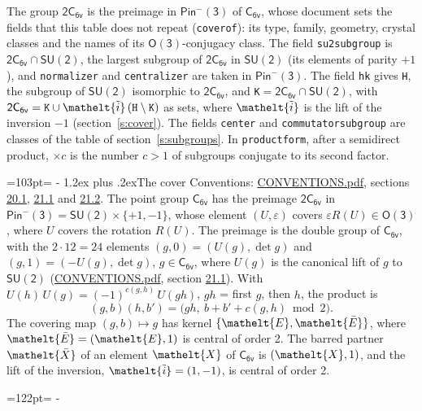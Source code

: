 \documentclass[10pt,a4paper]{article}
\makeatletter
\renewcommand\section{\@startsection{section}{1}{\z@}{-3ex plus -1ex minus -.2ex}%
  {1.2ex plus .2ex}{\normalfont\large\sffamily\bfseries\color{parttitle}}}
\newcommand{\needspace}[1]{\par\penalty-100\begingroup\dimen0=#1\relax\dimen2=\pagegoal
  \advance\dimen2-\pagetotal\ifdim\dimen0>\dimen2\relax\ifdim\dimen2>0pt\vfil\break\fi\fi
  \endgroup}
\numberwithin{equation}{section}
\newcommand{\eltfont}[1]{{\let\sigma\eltsigma\mathelt{#1}}}
\newcommand{\grp}[1]{\mathsf{#1}}
\newcommand{\elt}[1]{\eltfont{#1}}
\newcommand{\dirprod}{\times}
\newcommand{\barred}[1]{\bar{#1}}
\newcommand{\lift}[1]{\tilde{#1}}
\makeatother
\begin{document}
\leavevmode\label{n:element.inversion}\label{n:group.preimage}The group $\grp{2C_{6v}}$ is the preimage in $\grp{Pin^{-}(3)}$ of \href{../../../rotation/data/pdf/C6v.pdf}{$\grp{C_{6v}}$}, whose document sets the fields that this table does not repeat (\texttt{coverof}): its type, family, geometry, crystal classes and the names of its \href{../../../rotation/data/pdf/O3.pdf}{$\grp{O(3)}$}-conjugacy class. The field \texttt{su2subgroup} is $\grp{2C_{6v}} \cap \grp{SU(2)}$, the largest subgroup of $\grp{2C_{6v}}$ in $\grp{SU(2)}$ (its elements of parity $+1$), and \texttt{normalizer} and \texttt{centralizer} are taken in $\grp{Pin^{-}(3)}$. The field \texttt{hk} gives \texttt{H}, the subgroup of $\grp{SU(2)}$ isomorphic to $\grp{2C_{6v}}$, and \texttt{K}${} = \grp{2C_{6v}} \cap \grp{SU(2)}$, with $\grp{2C_{6v}} = \texttt{K} \cup \elt{\lift{i}}\,(\texttt{H} \setminus \texttt{K})$ as sets, where $\elt{\lift{i}}$ is the lift of the inversion $-1$ (section~\ref{s:cover}). The fields \texttt{center} and \texttt{commutatorsubgroup} are classes of the table of section~\ref{s:subgroups}.
\leavevmode\label{n:index.conjugates.c}In \texttt{productform}, after a semidirect product, ${\times}c$ is the number $c > 1$ of subgroups conjugate to its second factor.
\needspace{103pt}
\section{The cover}\label{s:cover}
Conventions: \href{../../CONVENTIONS.pdf}{CONVENTIONS.pdf}, sections \href{../../CONVENTIONS.pdf\#conv.20.1}{20.1}, \href{../../CONVENTIONS.pdf\#conv.21.1}{21.1} and \href{../../CONVENTIONS.pdf\#conv.21.2}{21.2}.
\leavevmode\label{n:group.pin.minus}\label{n:group.su2}\label{n:local.pin.sign}\label{n:matrix.covered}\label{n:matrix.lift.su2}\label{n:index.bar}The point group $\grp{C_{6v}}$ has the preimage $\grp{2C_{6v}}$ in $\grp{Pin^{-}(3)} = \grp{SU(2)} \dirprod \{+1, -1\}$, whose element $(U, \varepsilon)$ covers $\varepsilon R(U) \in \grp{O(3)}$, where $U$ covers the rotation $R(U)$. The preimage is the double group of $\grp{C_{6v}}$, with the $2 \cdot 12 = 24$ elements $(g, 0) = (U(g), \det g)$ and $(g, 1) = (-U(g), \det g)$, $g \in \grp{C_{6v}}$, where $U(g)$ is the canonical lift of $g$ to $\grp{SU(2)}$ (\href{../../CONVENTIONS.pdf}{CONVENTIONS.pdf}, section \href{../../CONVENTIONS.pdf\#conv.21.1}{21.1}). \label{n:function.cocycle}With $U(h)\,U(g) = (-1)^{c(g,h)}\,U(gh)$, $gh$ = first $g$, then $h$, the product is
\begin{equation}\label{e:product}(g, b)(h, b') = \bigl(gh,\ b + b' + c(g, h) \bmod 2\bigr).\end{equation}
\leavevmode\label{n:mark.bar}The covering map $(g, b) \mapsto g$ has kernel $\{\elt{E}, \elt{\barred{E}}\}$, where $\elt{\barred{E}} = (\elt{E}, 1)$ is central of order 2. \label{n:element.named}\label{n:mark.lift}The barred partner $\elt{\barred{X}}$ of an element $\elt{X}$ of $\grp{C_{6v}}$ is $(\elt{X}, 1)$, and the lift of the inversion, $\elt{\lift{i}} = (1, -1)$, is central of order 2.
\needspace{122pt}
\end{document}
